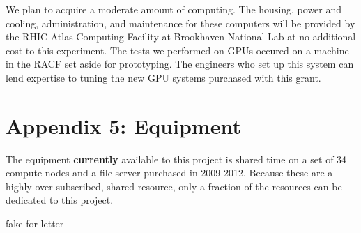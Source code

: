 \documentclass[12pt]{article}
\begin{document}
We plan to acquire a moderate amount of computing.  The housing, power and
cooling, administration, and maintenance for these computers will be provided
by the RHIC-Atlas Computing Facility at Brookhaven National Lab at no
additional cost to this experiment.	The tests we performed on GPUs occured on a
machine in the RACF set aside for prototyping.  The engineers who set up this
system can lend expertise to tuning the new GPU systems purchased with this
grant.

\newpage
{}
\section*{Appendix 5: Equipment}

The equipment {\bf currently} available to this project is shared time on a set
of 34 compute nodes and a file server purchased in 2009-2012.  
Because these are a highly over-subscribed, shared resource, only a fraction of
the resources can be dedicated to this project.

\newpage
{}
fake for letter
\end{document}
